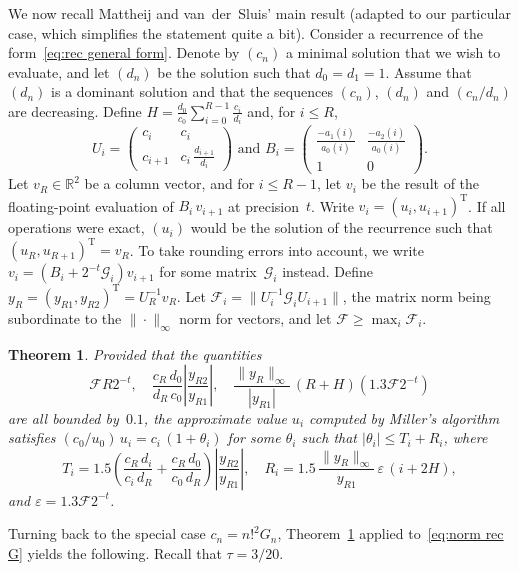 \documentclass[10pt, conference]{IEEEtran}
\newcommand{\twork}{t}
\newcommand{\R}{\mathbb{R}}
\newcommand{\transp}[1]{#1^{\operatorname T}}
\renewcommand{\Phi}{\mathcal{F}}
\newtheorem{theorem}{Theorem}
\begin{document}
We now recall Mattheij and van~der~Sluis' main result (adapted to our particular case, which simplifies the statement quite a bit).
Consider a recurrence of the form~\eqref{eq:rec general form}. Denote by $(c_n)$ a minimal solution that we wish to evaluate, and let $(d_n)$ be the solution such that $d_0 = d_1 = 1$. Assume that $(d_n)$ is a dominant solution and that the sequences $(c_n)$, $(d_n)$ and $(c_n/d_n)$ are decreasing. Define $H = \frac{d_0}{c_0} \sum_{i=0}^{R-1} \frac{c_i}{d_i}$ and, for $i \le R$,
\[U_i = 
    \begin{pmatrix}
      c_i & c_i\\
      c_{i+1} & c_i \,\frac{d_{i+1}}{d_i}
    \end{pmatrix} \text{ and }
B_i = 
    \begin{pmatrix}
      \frac{-a_1(i)}{a_0(i)} & \frac{-a_2(i)}{a_0(i)}\\
      1 & 0
    \end{pmatrix}.
\]
Let $v_R \in \R^2$ be a column vector, and for $i \le R-1$, let $v_i$ be the result of the floating-point evaluation of $B_i\,v_{i+1}$ at precision~$\twork$. Write $v_i = \transp{(u_i, u_{i+1})}$. If all operations were exact, $(u_i)$ would be the solution of the recurrence such that $\transp{(u_R, u_{R+1})}=v_R$. To take rounding errors into account, we write  $v_i = (B_i + 2^{-\twork} \mathcal{G}_i)v_{i+1}$ for some matrix~$\mathcal{G}_i$ instead. Define $y_R = \transp{(y_{R1}, y_{R2})} = U_R^{-1} v_R$. Let $\Phi_i = \|U_i^{-1}\mathcal{G}_i U_{i+1}\|$,  the matrix norm being subordinate to the $\|\cdot\|_\infty$ norm for vectors, and let $\Phi \ge \max_i \Phi_i$. 

\begin{theorem} \cite[Theorem~4.1]{MvdS}
\label{thm:MvdS}
Provided that the quantities
\[
  \Phi R 2^{-\twork}, \quad
  \frac{c_R\,d_0}{d_R\,c_0} \left|\frac{y_{R2}}{y_{R1}}\right|, \quad
  \frac{\|y_R\|_\infty}{|y_{R1}|}\, (R+H) (1.3 \Phi 2^{-\twork})
\]
are all bounded by~$0.1$, the approximate value $u_i$ computed by Miller's algorithm satisfies
$(c_0/u_0)\,u_i = c_i \, (1+\theta_i)$ for some $\theta_i$ such that $|\theta_i| \le T_i + R_i$, where
\[
  T_i = 1.5 \left(\frac{c_R\,d_i}{c_i\,d_R} + \frac{c_R\,d_0}{c_0\,d_R}\right) \left|\frac{y_{R2}}{y_{R1}}\right|,
  \quad
 R_i = 1.5 \, \frac{\|y_R\|_\infty}{y_{R1}} \, \varepsilon \, (i+2H),
\]
and $\varepsilon = 1.3 \Phi 2^{-\twork}$.
\end{theorem}

Turning back to the special case $c_n = n!^2 G_n$, Theorem~\ref{thm:MvdS} applied to~\eqref{eq:norm rec G} yields the following.
Recall that $\tau = 3/20$.
\end{document}
